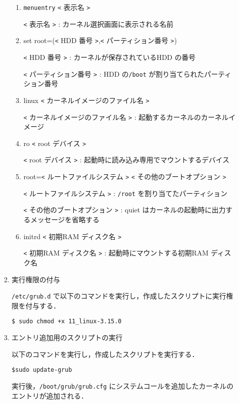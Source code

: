 \documentclass[12pt]{jsarticle}
\begin{document}
\begin{enumerate}
\begin{enumerate}
\begin{enumerate}
\item \verb|menuentry| \verb|<| 表示名 \verb|>|

\verb|<| 表示名 \verb|>| : カーネル選択画面に表示される名前

\item set root=(\verb|<| HDD 番号 \verb|>|,\verb|<| パーティション番号 \verb|>|)

\verb|<| HDD 番号 \verb|>| : カーネルが保存されているHDD の番号

\verb|<| パーティション番号 \verb|>| : HDD の\verb|/boot| が割り当てられたパーティション番号

\item linux \verb|<| カーネルイメージのファイル名 \verb|>|

\verb|<| カーネルイメージのファイル名 \verb|>| : 起動するカーネルのカーネルイメージ

\item ro \verb|<| root デバイス \verb|>|

    \verb|<| root デバイス \verb|>| : 起動時に読み込み専用でマウントするデバイス

\item root=\verb|<| ルートファイルシステム \verb|>| \verb|<| その他のブートオプション \verb|>|

\verb|<| ルートファイルシステム \verb|>| : \verb|/root| を割り当てたパーティション

\verb|<| その他のブートオプション \verb|>| : quiet はカーネルの起動時に出力するメッセージを省略する

\item initrd \verb|<| 初期RAM ディスク名 \verb|>|

\verb|<| 初期RAM ディスク名 \verb|>| : 起動時にマウントする初期RAM ディスク名

\end{enumerate}

\item 実行権限の付与

\verb|/etc/grub.d| で以下のコマンドを実行し，作成したスクリプトに実行権限を付与する．
\begin{verbatim}
$ sudo chmod +x 11_linux-3.15.0
\end{verbatim}

\item エントリ追加用のスクリプトの実行

以下のコマンドを実行し，作成したスクリプトを実行する．
\begin{verbatim}
$sudo update-grub
\end{verbatim}
実行後，\verb|/boot/grub/grub.cfg| にシステムコールを追加したカーネルのエントリが追加される．


\end{enumerate}
\end{enumerate}
\end{document}
